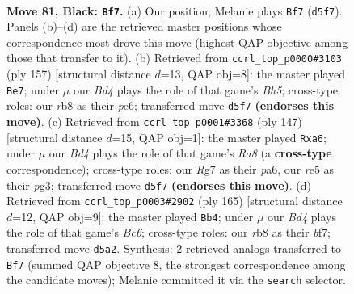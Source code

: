 \documentclass[11pt]{article}
\begin{document}
\clearpage

\begin{figure}[p]\centering
\begin{subfigure}{0.46\textwidth}\centering
\resizebox{\linewidth}{!}{%
\newchessgame
\chessboard[
  setfen={1R6/3k2r1/8/3bR3/1P6/2K5/8/8 b - - 36 81},
  showmover=false,
  pgfstyle=straightmove, color=movearrow, markmove={d5-f7}
]}
\caption{}
\end{subfigure}\hfill
\begin{subfigure}{0.46\textwidth}\centering
\resizebox{\linewidth}{!}{%
\newchessgame
\chessboard[
  setfen={2r5/8/4P1k1/1K6/4R2b/8/P7/8 b - - 6 79},
  showmover=false,
  pgfstyle=straightmove, color=movearrow, markmove={h4-e7}
]}
\caption{}
\end{subfigure}
\\[4pt]
\begin{subfigure}{0.46\textwidth}\centering
\resizebox{\linewidth}{!}{%
\newchessgame
\chessboard[
  setfen={8/6R1/P7/5k2/8/6P1/5K2/r7 b - - 6 74},
  showmover=false,
  pgfstyle=straightmove, color=movearrow, markmove={a1-a6}
]}
\caption{}
\end{subfigure}\hfill
\begin{subfigure}{0.46\textwidth}\centering
\resizebox{\linewidth}{!}{%
\newchessgame
\chessboard[
  setfen={8/5B2/3r3k/8/4K3/1Pb3R1/8/8 b - - 74 83},
  showmover=false,
  pgfstyle=straightmove, color=movearrow, markmove={c3-b4}
]}
\caption{}
\end{subfigure}
\caption{\textbf{Move 81, Black: \texttt{Bf7}.} (a) Our position; Melanie plays \texttt{Bf7} (\texttt{d5f7}). Panels (b)--(d) are the retrieved master positions whose correspondence most drove this move (highest QAP objective among those that transfer to it). (b) Retrieved from \texttt{ccrl\_top\_p0000\#3103} (ply 157) [structural distance $d$=13, QAP obj=8]: the master played \texttt{Be7}; under $\mu$ our \emph{Bd4} plays the role of that game's \emph{Bh5}; cross-type roles: our \emph{r}b8 as their \emph{p}e6; transferred move \texttt{d5f7} \textbf{(endorses this move)}. (c) Retrieved from \texttt{ccrl\_top\_p0001\#3368} (ply 147) [structural distance $d$=15, QAP obj=1]: the master played \texttt{Rxa6}; under $\mu$ our \emph{Bd4} plays the role of that game's \emph{Ra8} (a \textbf{cross-type} correspondence); cross-type roles: our \emph{R}g7 as their \emph{p}a6, our \emph{r}e5 as their \emph{p}g3; transferred move \texttt{d5f7} \textbf{(endorses this move)}. (d) Retrieved from \texttt{ccrl\_top\_p0003\#2902} (ply 165) [structural distance $d$=12, QAP obj=9]: the master played \texttt{Bb4}; under $\mu$ our \emph{Bd4} plays the role of that game's \emph{Bc6}; cross-type roles: our \emph{r}b8 as their \emph{b}f7; transferred move \texttt{d5a2}. Synthesis: 2 retrieved analogs transferred to \texttt{Bf7} (summed QAP objective 8, the strongest correspondence among the candidate moves); Melanie committed it via the \texttt{search} selector.}
\label{fig:thought-m161}
\end{figure}
\end{document}

